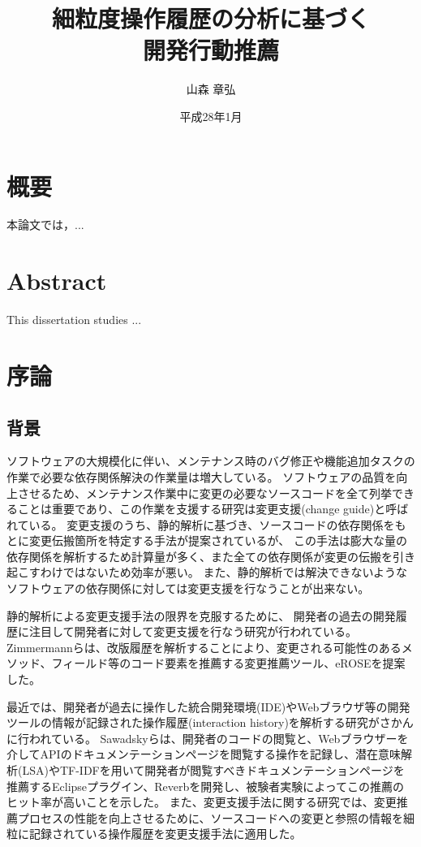 \documentclass[a4paper]{jsbook}
\title{細粒度操作履歴の分析に基づく\\開発行動推薦}
\author{山森 章弘}
\date{平成28年1月}
\affiliation{大学院情報理工学研究科 計算工学専攻}
\begin{document}
\frontmatter
\maketitle

\chapter*{概要}
本論文では，...

\chapter*{Abstract}
This dissertation studies ...

\tableofcontents
\listoffigures
\listoftables

\mainmatter

\chapter{序論}
\section{背景}
ソフトウェアの大規模化に伴い、メンテナンス時のバグ修正や機能追加タスクの作業で必要な依存関係解決の作業量は増大している。
ソフトウェアの品質を向上させるため、メンテナンス作業中に変更の必要なソースコードを全て列挙できることは重要であり、この作業を支援する研究は変更支援(change guide)と呼ばれている。
変更支援のうち、静的解析に基づき、ソースコードの依存関係をもとに変更伝搬箇所を特定する手法が提案されている\cite{792645}が、
この手法は膨大な量の依存関係を解析するため計算量が多く、また全ての依存関係が変更の伝搬を引き起こすわけではないため効率が悪い\cite{Geipel:2009}。
また、静的解析では解決できないようなソフトウェアの依存関係に対しては変更支援を行なうことが出来ない\cite{5609732}。

静的解析による変更支援手法の限界を克服するために、
開発者の過去の開発履歴に注目して開発者に対して変更支援を行なう研究が行われている\cite{738508, Kagdi:2006}。
Zimmermannらは、改版履歴を解析することにより、変更される可能性のあるメソッド、フィールド等のコード要素を推薦する変更推薦ツール、eROSE\cite{Zimmermann:2005}を提案した。

最近では、開発者が過去に操作した統合開発環境(IDE)やWebブラウザ等の開発ツールの情報が記録された操作履歴(interaction history)\cite{rsse:2014}を解析する研究がさかんに行われている。
Sawadskyら\cite{Sawadsky:2013}は、開発者のコードの閲覧と、Webブラウザーを介してAPIのドキュメンテーションページを閲覧する操作を記録し、潜在意味解析(LSA)やTF-IDFを用いて開発者が閲覧すべきドキュメンテーションページを推薦するEclipseプラグイン、Reverbを開発し、被験者実験によってこの推薦のヒット率が高いことを示した。
また、変更支援手法に関する研究\cite{6233415,KatoJapanese:2011,ss2012-76,ss2013-84,Yamamori:2016}では、変更推薦プロセスの性能を向上させるために、ソースコードへの変更と参照の情報を細粒に記録されている操作履歴を変更支援手法に適用した。
\end{document}
